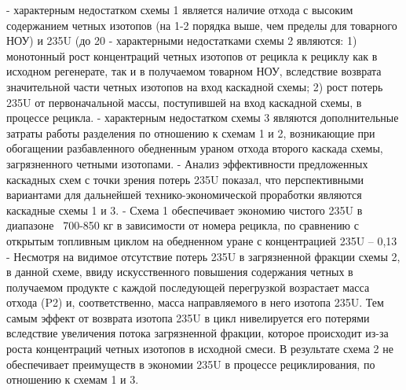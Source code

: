 -	характерным недостатком схемы 1 является наличие отхода с высоким содержанием четных изотопов (на 1-2 порядка выше, чем пределы для товарного НОУ) и 235U (до 20%
-	характерными недостатками схемы 2 являются: 1) монотонный рост концентраций четных изотопов от рецикла к рециклу как в исходном регенерате, так и в получаемом товарном НОУ, вследствие возврата значительной части четных изотопов на вход каскадной схемы; 2) рост потерь 235U от первоначальной массы, поступившей на вход каскадной схемы, в процессе рецикла.
-	характерным недостатком схемы 3 являются дополнительные затраты работы разделения по отношению к схемам 1 и 2, возникающие при обогащении разбавленного обедненным ураном отхода второго каскада схемы, загрязненного четными изотопами.
-	 Анализ эффективности предложенных каскадных схем с точки зрения потерь 235U показал, что перспективными вариантами для дальнейшей технико-экономической проработки являются каскадные схемы 1 и 3.
-	 Схема 1 обеспечивает экономию чистого 235U в диапазоне ~700-850 кг в зависимости от номера рецикла, по сравнению с открытым топливным циклом на обедненном уране с концентрацией 235U – 0,13%
-	Несмотря на видимое отсутствие потерь 235U в загрязненной фракции схемы 2, в данной схеме, ввиду искусственного повышения содержания четных в получаемом продукте с каждой последующей перегрузкой возрастает масса отхода (P2) и, соответственно, масса направляемого в него изотопа 235U. Тем самым эффект от возврата изотопа 235U в цикл нивелируется его потерями вследствие увеличения потока загрязненной фракции, которое происходит из-за роста концентраций четных изотопов в исходной смеси. В результате схема 2 не обеспечивает преимуществ в экономии 235U в процессе рециклирования, по отношению к схемам 1 и 3.
